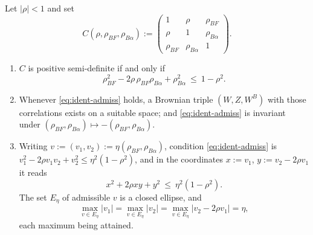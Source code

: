 \documentclass[../../../main.tex]{subfiles}
\begin{document}
\begin{lemma}\label{lem:ident-psd}
Let $|\rho|<1$ and set
\[
C(\rho,\rho_{BF},\rho_{B\alpha}):=\begin{pmatrix}1&\rho&\rho_{BF}\\ \rho&1&\rho_{B\alpha}\\ \rho_{BF}&\rho_{B\alpha}&1\end{pmatrix}.
\]
\begin{enumerate}[nosep,label=(\roman*)]
\item $C$ is positive semi-definite if and only if
\begin{equation}\label{eq:ident-admiss}
\rho_{BF}^2-2\rho\,\rho_{BF}\rho_{B\alpha}+\rho_{B\alpha}^2\ \le\ 1-\rho^2 .
\end{equation}
\item Whenever \eqref{eq:ident-admiss} holds, a Brownian triple $(W,Z,W^B)$ with those correlations exists on a suitable space; and \eqref{eq:ident-admiss} is invariant under $(\rho_{BF},\rho_{B\alpha})\mapsto-(\rho_{BF},\rho_{B\alpha})$.
\item Writing $v:=(v_1,v_2):=\eta(\rho_{BF},\rho_{B\alpha})$, condition \eqref{eq:ident-admiss} is $v_1^2-2\rho v_1v_2+v_2^2\le\eta^2(1-\rho^2)$, and in the coordinates $x:=v_1$, $y:=v_2-2\rho v_1$ it reads
\begin{equation}\label{eq:ident-ellipse}
x^2+2\rho xy+y^2\ \le\ \eta^2(1-\rho^2).
\end{equation}
The set $E_\eta$ of admissible $v$ is a closed ellipse, and
\begin{equation}\label{eq:ident-extremes}
\max_{v\in E_\eta}|v_1|=\max_{v\in E_\eta}|v_2|=\max_{v\in E_\eta}|v_2-2\rho v_1|=\eta,
\end{equation}
each maximum being attained.
\end{enumerate}
\end{lemma}
\end{document}
